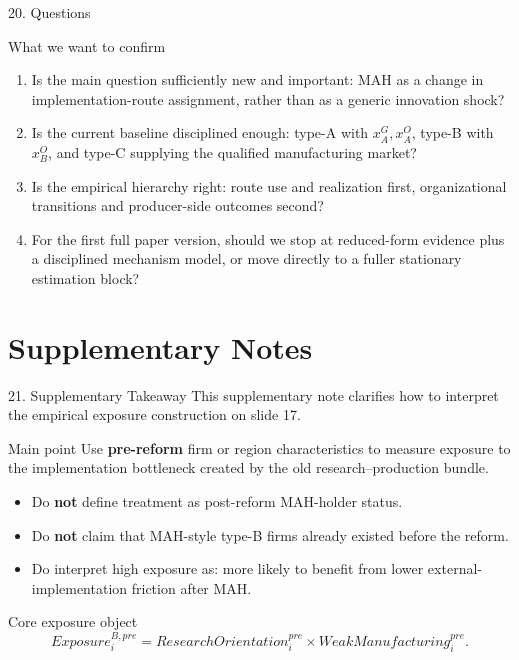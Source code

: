 \documentclass[aspectratio=169,11pt]{beamer}
\begin{document}
\begin{frame}{20. Questions}
\footnotesize
\begin{block}{What we want to confirm}
\begin{enumerate}
\item Is the main question sufficiently new and important: MAH as a change in implementation-route assignment, rather than as a generic innovation shock?
\item Is the current baseline disciplined enough: type-A with \(x_A^G,x_A^O\), type-B with \(x_B^O\), and type-C supplying the qualified manufacturing market?
\item Is the empirical hierarchy right: route use and realization first, organizational transitions and producer-side outcomes second?
\item For the first full paper version, should we stop at reduced-form evidence plus a disciplined mechanism model, or move directly to a fuller stationary estimation block?
\end{enumerate}
\end{block}
\end{frame}

\appendix
\section{Supplementary Notes}

\begin{frame}{21. Supplementary Takeaway}
\small
This supplementary note clarifies how to interpret the empirical exposure construction on slide 17.

\begin{block}{Main point}
Use \textbf{pre-reform} firm or region characteristics to measure exposure to the implementation bottleneck created by the old research--production bundle.
\end{block}

\begin{itemize}
\item Do \textbf{not} define treatment as post-reform MAH-holder status.
\item Do \textbf{not} claim that MAH-style type-B firms already existed before the reform.
\item Do interpret high exposure as: more likely to benefit from lower external-implementation friction after MAH.
\end{itemize}

\begin{block}{Core exposure object}
\[
Exposure_i^{B,pre}=ResearchOrientation_i^{pre}\times WeakManufacturing_i^{pre}.
\]
\end{block}
\end{frame}
\end{document}
